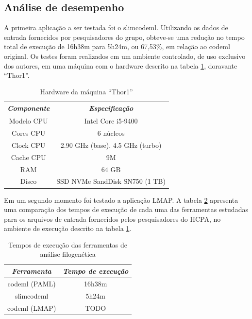 \documentclass[cic,tc]{iiufrgs}
\begin{document}
\subsection{Análise de desempenho}

A primeira aplicação a ser testada foi o
slimcodeml.\cite{schabauer2012slimcodeml} Utilizando os dados de entrada
fornecidos por pesquisadores do grupo, obteve-se uma redução no tempo total de
execução de 16h38m para 5h24m, ou 67,53\%, em relação ao codeml original. Os
testes foram realizados em um ambiente controlado, de uso exclusivo dos
autores, em uma máquina com o hardware descrito na tabela \ref{tbl:thor1},
doravante ``Thor1''.

\begin{table}[h]
    \caption{Hardware da máquina ``Thor1''}
    \centering
        \begin{tabular}{c|c}
          \hline
          \textit{Componente}  &   \textit{Especificação} \\
          \hline
          \hline
          Modelo CPU & Intel Core i5-9400 \\
          Cores CPU & 6 núcleos\\
          Clock CPU & 2.90 GHz (base), 4.5 GHz (turbo) \\
          Cache CPU & 9M \\
          RAM & 64 GB \\
          Disco & SSD NVMe SandDisk SN750 (1 TB) \\
          \hline
        \end{tabular}
    \label{tbl:thor1}
\end{table}

Em um segundo momento foi testado a aplicação LMAP. A tabela \ref{tbl:paml}
apresenta uma comparação dos tempos de execução de cada uma das ferramentas
estudadas para os arquivos de entrada fornecidos pelos pesquisadores do HCPA,
no ambiente de execução descrito na tabela \ref{tbl:thor1}.

\begin{table}[h]
    \caption{Tempos de execução das ferramentas de análise filogenética}
    \centering
        \begin{tabular}{c|c}
          \hline
          \textit{Ferramenta}  &   \textit{Tempo de execução} \\
          \hline
          \hline
          codeml (PAML) & 16h38m \\
          slimcodeml & 5h24m \\
          codeml (LMAP) & TODO \\
          \hline
        \end{tabular}
    \label{tbl:paml}
\end{table}
\end{document}
